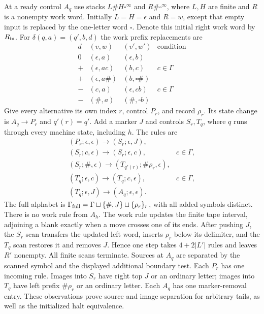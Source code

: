 At a ready control $A_q$ use stacks
$L\#H\square^\infty$ and $R\#\square^\infty$, where $L,H$ are finite
and $R$ is a nonempty work word.  Initially $L=H=\epsilon$ and $R=w$,
except that empty input is replaced by the one-letter word $\square$.
Denote this initial right work word by $R_{\rm in}$.
For $\delta(q,a)=(q',b,d)$ the work prefix replacements are
\[
\begin{array}{c|c|c|l}
 d&(v,w)&(v',w')&\text{condition}\\\hline
 0&(\epsilon,a)&(\epsilon,b)&\\
 +&(\epsilon,ac)&(b,c)&c\in\Gamma\\
 +&(\epsilon,a\#)&(b,\square\#)&\\
 -&(c,a)&(\epsilon,cb)&c\in\Gamma\\
 -&(\#,a)&(\#,\square b)&
\end{array}
\]
Give every alternative its own index $r$, control $P_r$, and record
$\rho_r$.  Its state change is $A_q\to P_r$ and $q'(r)=q'$.
Add a marker $J$ and controls $S_r,T_q$, where $q$ runs through every
machine state, including $h$.  The rules are
\[
\begin{array}{ll}
 (P_r;\epsilon,\epsilon)\to(S_r;\epsilon,J),\\
 (S_r;c,\epsilon)\to(S_r;\epsilon,c),&c\in\Gamma,\\
 (S_r;\#,\epsilon)\to(T_{q'(r)};\#\rho_r,\epsilon),\\
 (T_q;\epsilon,c)\to(T_q;c,\epsilon),&c\in\Gamma,\\
 (T_q;\epsilon,J)\to(A_q;\epsilon,\epsilon).
\end{array}
\]
The full alphabet is $\Gamma_{\rm full}=\Gamma\sqcup\{\#,J\}
\sqcup\{\rho_r\}_r$, with all added symbols distinct.
There is no work rule from $A_h$.
The work rule updates the finite tape interval, adjoining a blank exactly
when a move crosses one of its ends.  After pushing $J$, the $S_r$ scan
transfers the updated left word, inserts $\rho_r$ below its delimiter,
and the $T_q$ scan restores it and removes $J$.  Hence one step takes
$4+2|L'|$ rules and leaves $R'$ nonempty.  All finite scans terminate.
Sources at $A_q$ are separated by the scanned symbol and the displayed
additional boundary test.  Each $P_r$ has one incoming rule.  Images
into $S_r$ have right top $J$ or an ordinary letter; images into $T_q$
have left prefix $\#\rho_r$ or an ordinary letter.  Each $A_q$ has one
marker-removal entry.  These observations prove source and image
separation for arbitrary tails, as well as the initialized halt equivalence.

